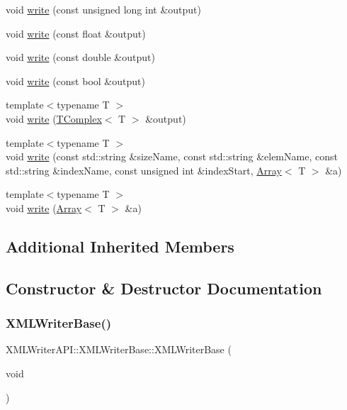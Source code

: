 \begin{DoxyCompactItemize}
void \mbox{\hyperlink{classXMLWriterAPI_1_1XMLWriterBase_aa41f0c59ff0d482ee19ea2e299a9972d}{write}} (const unsigned long int \&output)
\item 
void \mbox{\hyperlink{classXMLWriterAPI_1_1XMLWriterBase_a2e56c14a785820e1f82459988b4e1dd6}{write}} (const float \&output)
\item 
void \mbox{\hyperlink{classXMLWriterAPI_1_1XMLWriterBase_a9fcb104bc58833460bfba6439d90b419}{write}} (const double \&output)
\item 
void \mbox{\hyperlink{classXMLWriterAPI_1_1XMLWriterBase_ac9c7d2ed0127b4dd05b4b3c0225d9f34}{write}} (const bool \&output)
\item 
{\footnotesize template$<$typename T $>$ }\\void \mbox{\hyperlink{classXMLWriterAPI_1_1XMLWriterBase_a00b5edcaf39f8bdaf2aa5eed7118c8e7}{write}} (\mbox{\hyperlink{classXMLTComplex_1_1TComplex}{T\+Complex}}$<$ T $>$ \&output)
\item 
{\footnotesize template$<$typename T $>$ }\\void \mbox{\hyperlink{classXMLWriterAPI_1_1XMLWriterBase_a85d9236f5ec6ccc3c8559d4ec431bf6b}{write}} (const std\+::string \&size\+Name, const std\+::string \&elem\+Name, const std\+::string \&index\+Name, const unsigned int \&index\+Start, \mbox{\hyperlink{classXMLArray_1_1Array}{Array}}$<$ T $>$ \&a)
\item 
{\footnotesize template$<$typename T $>$ }\\void \mbox{\hyperlink{classXMLWriterAPI_1_1XMLWriterBase_a5475e21d716c65a21d620b4cde0c9ca1}{write}} (\mbox{\hyperlink{classXMLArray_1_1Array}{Array}}$<$ T $>$ \&a)
\end{DoxyCompactItemize}
\subsection*{Additional Inherited Members}


\subsection{Constructor \& Destructor Documentation}
\mbox{\label{classXMLWriterAPI_1_1XMLWriterBase_a1620cf7f4428110d2d77b4324293512e}} 
\subsubsection{\texorpdfstring{XMLWriterBase()}{XMLWriterBase()}\hspace{0.1cm}{\footnotesize\ttfamily [1/3]}}
{\footnotesize\ttfamily X\+M\+L\+Writer\+A\+P\+I\+::\+X\+M\+L\+Writer\+Base\+::\+X\+M\+L\+Writer\+Base (\begin{DoxyParamCaption}\item[{void}]{ }\end{DoxyParamCaption})\hspace{0.3cm}{\ttfamily [inline]}}

